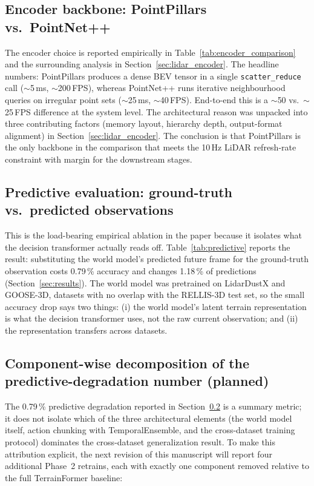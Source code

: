 \documentclass[sensors,article,submit,pdftex,moreauthors]{Definitions/mdpi}
\begin{document}
\subsection{Encoder backbone: PointPillars vs.\ PointNet++}
\label{sec:ablation_encoder}

The encoder choice is reported empirically in Table~\ref{tab:encoder_comparison} and the surrounding analysis in Section~\ref{sec:lidar_encoder}. The headline numbers: PointPillars produces a dense BEV tensor in a single \texttt{scatter\_reduce} call ($\sim$5\,ms, $\sim$200\,FPS), whereas PointNet++ runs iterative neighbourhood queries on irregular point sets ($\sim$25\,ms, $\sim$40\,FPS). End-to-end this is a $\sim$50 vs.\ $\sim$25\,FPS difference at the system level. The architectural reason was unpacked into three contributing factors (memory layout, hierarchy depth, output-format alignment) in Section~\ref{sec:lidar_encoder}. The conclusion is that PointPillars is the only backbone in the comparison that meets the 10\,Hz LiDAR refresh-rate constraint with margin for the downstream stages.

\subsection{Predictive evaluation: ground-truth vs.\ predicted observations}
\label{sec:ablation_predictive}

This is the load-bearing empirical ablation in the paper because it isolates what the decision transformer actually reads off. Table~\ref{tab:predictive} reports the result: substituting the world model's predicted future frame for the ground-truth observation costs 0.79\,\% accuracy and changes 1.18\,\% of predictions (Section~\ref{sec:results}). The world model was pretrained on LidarDustX and GOOSE-3D, datasets with no overlap with the RELLIS-3D test set, so the small accuracy drop says two things: (i) the world model's latent terrain representation is what the decision transformer uses, not the raw current observation; and (ii) the representation transfers across datasets.

\subsection{Component-wise decomposition of the predictive-degradation number (planned)}
\label{sec:ablation_decomposition}

The 0.79\,\% predictive degradation reported in Section~\ref{sec:ablation_predictive} is a summary metric; it does not isolate which of the three architectural elements (the world model itself, action chunking with TemporalEnsemble, and the cross-dataset training protocol) dominates the cross-dataset generalization result. To make this attribution explicit, the next revision of this manuscript will report four additional Phase~2 retrains, each with exactly one component removed relative to the full TerrainFormer baseline:
\end{document}

